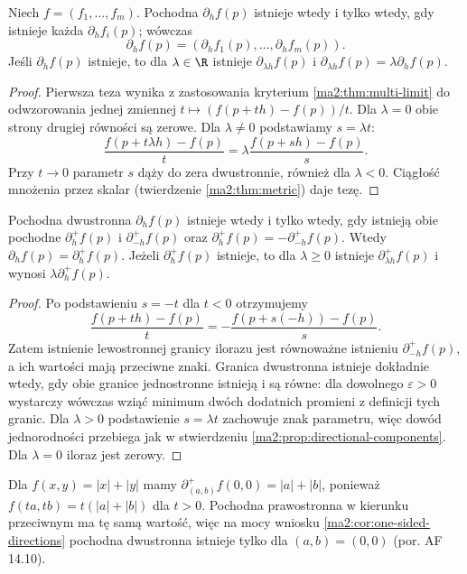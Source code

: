 \begin{stwierdzenie}
\label{ma2:prop:directional-components}
Niech $f=(f_1,\ldots,f_m)$. Pochodna $\partial_h f(p)$
istnieje wtedy i tylko wtedy, gdy istnieje każda
$\partial_h f_i(p)$; wówczas
\[
 \partial_h f(p)=(\partial_h f_1(p),\ldots,
 \partial_h f_m(p)).
\]
Jeśli $\partial_h f(p)$ istnieje, to dla $\lambda\in\R$
istnieje $\partial_{\lambda h} f(p)$ i
$\partial_{\lambda h}f(p)=\lambda\partial_h f(p)$.
\end{stwierdzenie}
\begin{proof}
Pierwsza teza wynika z zastosowania kryterium
\ref{ma2:thm:multi-limit} do odwzorowania jednej
zmiennej $t\mapsto(f(p+th)-f(p))/t$.
Dla $\lambda=0$ obie strony drugiej równości są zerowe.
Dla $\lambda\ne0$ podstawiamy $s=\lambda t$:
\[
 \frac{f(p+t\lambda h)-f(p)}{t}
 =\lambda\frac{f(p+sh)-f(p)}s.
\]
Przy $t\to0$ parametr $s$ dąży do zera dwustronnie,
również dla $\lambda<0$. Ciągłość mnożenia przez skalar
(twierdzenie \ref{ma2:thm:metric}) daje tezę.
\end{proof}

\begin{wniosek}
\label{ma2:cor:one-sided-directions}
Pochodna dwustronna $\partial_h f(p)$ istnieje wtedy
i tylko wtedy, gdy istnieją obie pochodne
$\partial_h^+f(p)$ i $\partial_{-h}^+f(p)$ oraz
$\partial_h^+f(p)=-\partial_{-h}^+f(p)$.
Wtedy $\partial_h f(p)=\partial_h^+f(p)$.
Jeżeli $\partial_h^+f(p)$ istnieje, to dla $\lambda\ge0$
istnieje $\partial_{\lambda h}^+f(p)$ i wynosi
$\lambda\partial_h^+f(p)$.
\end{wniosek}
\begin{proof}
Po podstawieniu $s=-t$ dla $t<0$ otrzymujemy
\[
 \frac{f(p+th)-f(p)}t
 =-\frac{f(p+s(-h))-f(p)}s.
\]
Zatem istnienie lewostronnej granicy ilorazu jest
równoważne istnieniu $\partial_{-h}^+f(p)$, a ich
wartości mają przeciwne znaki. Granica dwustronna
istnieje dokładnie wtedy, gdy obie granice jednostronne
istnieją i są równe: dla dowolnego $\varepsilon>0$
wystarczy wówczas wziąć minimum dwóch dodatnich promieni
z definicji tych granic. Dla $\lambda>0$ podstawienie
$s=\lambda t$ zachowuje znak parametru, więc dowód
jednorodności przebiega jak w stwierdzeniu
\ref{ma2:prop:directional-components}. Dla $\lambda=0$
iloraz jest zerowy.
\end{proof}

\begin{przyklad}
Dla $f(x,y)=|x|+|y|$ mamy
$\partial_{(a,b)}^+f(0,0)=|a|+|b|$, ponieważ
$f(ta,tb)=t(|a|+|b|)$ dla $t>0$.
Pochodna prawostronna w kierunku przeciwnym ma tę samą
wartość, więc na mocy wniosku
\ref{ma2:cor:one-sided-directions} pochodna dwustronna
istnieje tylko dla $(a,b)=(0,0)$ (por. AF 14.10).
\end{przyklad}

